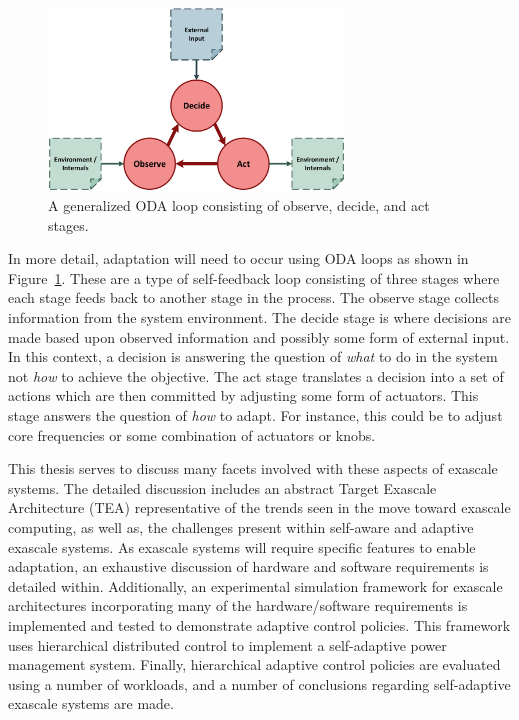 \begin{figure}[htb!]
    \centering
    \includegraphics[width=0.7\textwidth]{Fig/ODA_loop_general.pdf}
    \caption[Generalized ODA Loop]{A generalized ODA loop consisting of observe, decide, and act stages.}
    \label{fig:ODA-generic}
\end{figure}

In more detail, adaptation will need to occur using ODA loops as shown in Figure~\ref{fig:ODA-generic}. These are a type of self-feedback loop consisting of three stages where each stage feeds back to another stage in the process. The observe stage collects information from the system environment. The decide stage is where decisions are made based upon observed information and possibly some form of external input. In this context, a decision is answering the question of \textit{what} to do in the system not \textit{how} to achieve the objective. The act stage translates a decision into a set of actions which are then committed by adjusting some form of actuators. This stage answers the question of \textit{how} to adapt. For instance, this could be to adjust core frequencies or some combination of actuators or knobs.

This thesis serves to discuss many facets involved with these aspects of exascale systems. The detailed discussion includes an abstract Target Exascale Architecture (TEA) representative of the trends seen in the move toward exascale computing, as well as, the challenges present within self-aware and adaptive exascale systems. As exascale systems will require specific features to enable adaptation, an exhaustive discussion of hardware and software requirements is detailed within. Additionally, an experimental simulation framework for exascale architectures incorporating many of the hardware/software requirements is implemented and tested to demonstrate adaptive control policies. This framework uses hierarchical distributed control to implement a self-adaptive power management system. Finally, hierarchical adaptive control policies are evaluated using a number of workloads, and a number of conclusions regarding self-adaptive exascale systems are made.

